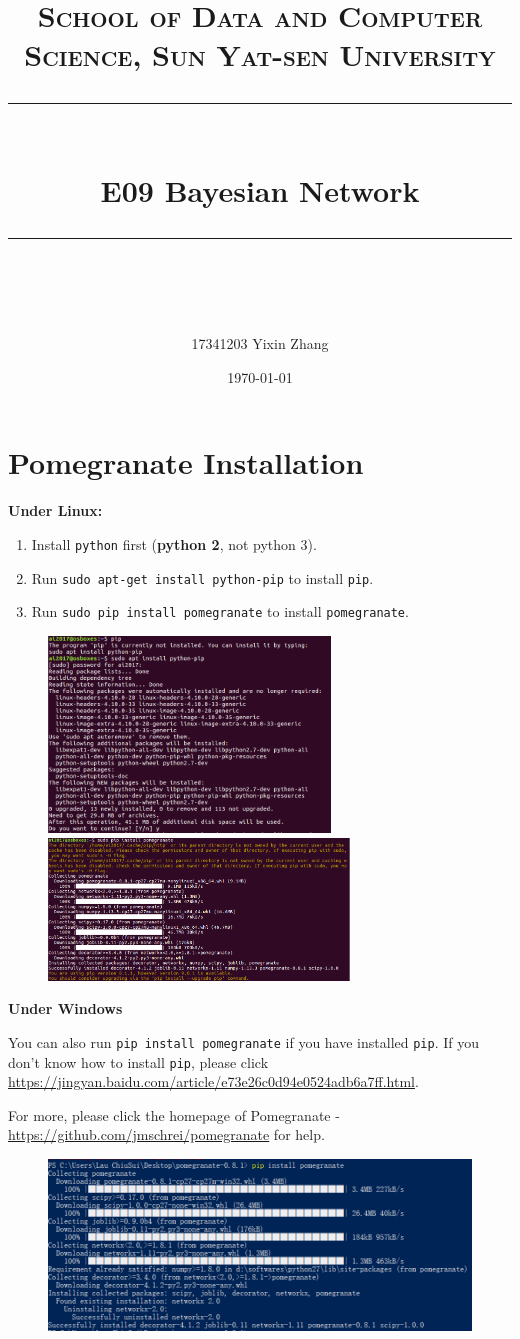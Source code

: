 \documentclass[a4paper, 11pt]{article}
\title{	
\normalfont \normalsize
\textsc{School of Data and Computer Science, Sun Yat-sen University} \\ [25pt] %
\rule{\textwidth}{0.5pt} \\[0.4cm] %
\huge  E09 Bayesian Network \\ %
\rule{\textwidth}{2pt} \\[0.5cm] %
\author{17341203 Yixin Zhang}
\date{\normalsize\today}
}
\begin{document}
\maketitle
\tableofcontents
\newpage
\section{Pomegranate Installation}
\textbf{Under Linux:}
\begin{enumerate}
\item Install \texttt{python} first (\textbf{python 2}, not python 3).
\item Run \texttt{sudo apt-get install python-pip} to install \texttt{pip}.
\item Run \texttt{sudo pip install pomegranate} to install \texttt{pomegranate}.
\end{enumerate}
\begin{figure}[h]
  \centering
  \includegraphics[width=7.5cm]{Pic/install1}
  \qquad
  \includegraphics[width=8cm]{Pic/install2}
\end{figure}
\textbf{Under Windows}

You can also run \texttt{pip install pomegranate} if you have installed \texttt{pip}. If you don't know how to install \texttt{pip}, please click \url{https://jingyan.baidu.com/article/e73e26c0d94e0524adb6a7ff.html}.

For more, please click the homepage of Pomegranate - \url{https://github.com/jmschrei/pomegranate} for help. 
\begin{figure}[h]

  
  \centering
\includegraphics[width=16cm]{Pic/po}
  
\end{figure}
\end{document}
